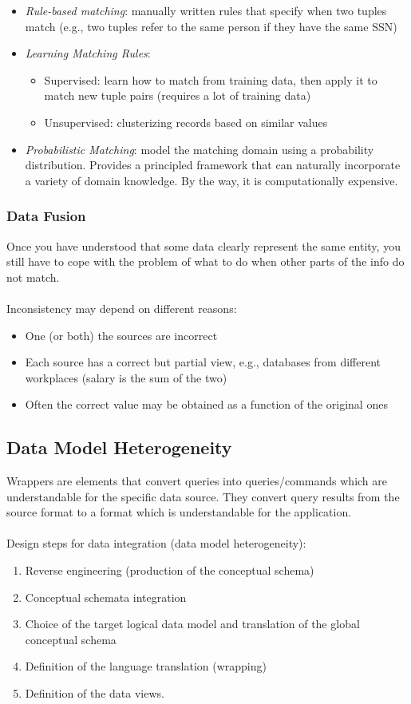 \documentclass[10pt,a4paper]{article}
\newcommand{\nline}{\\~\\}
\begin{document}
\begin{itemize}
\begin{itemize}
		\item \textit{Rule-based matching}: manually written rules that specify when two tuples match (e.g., two tuples refer to the same person if they have the same SSN)
		\item \textit{Learning Matching Rules}: 
		\begin{itemize}
			\item Supervised: learn how to match from training data, then apply it to match new tuple pairs (requires a lot of training data)
			\item Unsupervised: clusterizing records based on similar values
		\end{itemize}
		\item \textit{Probabilistic Matching}: model the matching domain using a probability distribution. Provides a principled framework that can naturally incorporate a variety of domain knowledge. By the way, it is computationally expensive.
	\end{itemize}
\end{itemize}
\subsubsection{Data Fusion}
Once you have understood that some data clearly represent the same entity, you still have to cope with the problem of what to do when other parts of the info do not match. \nline
Inconsistency may depend on different reasons:
\begin{itemize}
	\item One (or both) the sources are incorrect
	\item Each source has a correct but partial view, e.g., databases from different workplaces (salary is the sum of the two)
	\item Often the correct value may be obtained as a function of the original ones
\end{itemize}
\subsection{Data Model Heterogeneity}
Wrappers are elements that convert queries into queries/commands which are understandable for the specific data source. They convert query results from the source format to a format which is understandable for the application.
 \nline
 Design steps for data integration (data model heterogeneity):
\begin{enumerate}
	\item Reverse engineering (production of the conceptual schema)
	\item Conceptual schemata integration
	\item Choice of the target logical data model and translation of the global conceptual schema 
	\item Definition of the language translation (wrapping)
	\item Definition of the data views.
\end{enumerate}
\pagebreak
\end{document}
